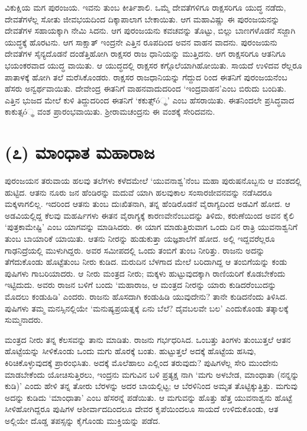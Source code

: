 ವಿಕುಕ್ಷಿಯ ಮಗ ಪುರಂಜಯ. ಇವನು ತುಂಬ ಕೀರ್ತಿಶಾಲಿ. ಒಮ್ಮೆ ದೇವತೆಗಳಿಗೂ ರಾಕ್ಷಸರಿಗೂ ಯುದ್ಧ ನಡೆದು, ದೇವತೆಗಳೆಲ್ಲ ಸೋತು ಜೀವಭಯದಿಂದ ದಿಕ್ಕಾಪಾಲಾಗ ಬೇಕಾಯಿತು. ಆಗ ಮಹಾವಿಷ್ಣು ಈ ಪುರಂಜಯನನ್ನು ದೇವತೆಗಳ ಸಹಾಯಕ್ಕಾಗಿ ನೇಮಿ ಸಿದನು. ಆಗ ಪುರಂಜಯನು ಕವಚವನ್ನು ತೊಟ್ಟು, ಬಿಲ್ಲು ಬಾಣಗಳೊಡನೆ ಸಜ್ಜಾಗಿ ಯುದ್ಧಕ್ಕೆ ಹೊರಟನು. ಆಗ ಸಾಕ್ಷಾತ್ ಇಂದ್ರನೇ ಎತ್ತಿನ ರೂಪದಿಂದ ಅವನ ವಾಹನ ವಾದನು. ಪುರಂಜಯನು ದೇವತೆಗಳ ಸೈನ್ಯದೊಡನೆ ದಂಡೆತ್ತಿಹೋಗಿ ರಾಕ್ಷಸರ ರಾಜ ಧಾನಿಯನ್ನು ಮುತ್ತಿದನು. ಆಗ ರಾಕ್ಷಸರಿಗೂ ಆತನಿಗೂ ಭಯಂಕರವಾದ ಯುದ್ಧ ವಾಯಿತು. ಆ ಯುದ್ಧದಲ್ಲಿ ರಾಕ್ಷಸರ ಕಗ್ಗೊಲೆಯಾಗಿಹೋಯಿತು. ಸಾಯದೆ ಉಳಿದವ ರೆಲ್ಲರೂ ಪಾತಾಳಕ್ಕೆ ಹೋಗಿ ತಲೆ ಮರೆಸಿಕೊಂಡರು. ರಾಕ್ಷಸರ ರಾಜಧಾನಿಯನ್ನು ಗೆದ್ದುದ ರಿಂದ ಈತನಿಗೆ ಪುರಂಜಯನೆಂಬ ಹೆಸರು ಅನ್ವರ್ಥವಾಯಿತು. ದೇವೇಂದ್ರ ಈತನಿಗೆ ವಾಹನವಾದುದರಿಂದ ‘ಇಂದ್ರವಾಹನ’ಎಂಬ ಬಿರುದು ಬಂದಿತು. ಎತ್ತಿನ ಭುಜದ ಮೇಲೆ ಕುಳಿ ತಿದ್ದುದರಿಂದ ಈತನಿಗೆ ‘ಕಕುತ್ಸ್​ó್ಥ’ ಎಂಬ ಹೆಸರಾಯಿತು. ಈತನಿಂದಲೇ ಪ್ರಸಿದ್ಧವಾದ ಕಾಕುತ್ಸó್ಥ ವಂಶ ಪ್ರಾರಂಭವಾಯಿತು. ಶ್ರೀರಾಮಚಂದ್ರನು ಈ ವಂಶಕ್ಕೆ ಸೇರಿದವನು.


\section{(೭) ಮಾಂಧಾತ ಮಹಾರಾಜ}

ಪುರಂಜಯನ ತರುವಾಯ ಹಲವು ತಲೆಗಳು ಕಳೆದಮೇಲೆ ‘ಯುವನಾಶ್ವ’ನೆಂಬ ಮಹಾ ಪುರುಷನೊಬ್ಬನು ಆ ವಂಶದಲ್ಲಿ ಹುಟ್ಟಿದ. ಆತನು ನೂರು ಜನ ಹೆಂಡಿರನ್ನು ಮದುವೆ ಯಾಗಿ ಹಲವುಕಾಲ ಸಂಸಾರಜೀವನವನ್ನು ನಡೆಸಿದರೂ ಮಕ್ಕಳಾಗಲಿಲ್ಲ. ಇದರಿಂದ ಆತನು ತುಂಬ ದುಃಖಿತನಾಗಿ, ತನ್ನ ಹೆಂಡಿರೊಡನೆ ವೈರಾಗ್ಯದಿಂದ ಅಡವಿಗೆ ಹೋದ. ಆ ಅಡವಿಯಲ್ಲಿದ್ದ ಕೆಲವು ಮಹರ್ಷಿಗಳು ಈತನ ವೈರಾಗ್ಯಕ್ಕೆ ಕಾರಣವೇನೆಂಬುದನ್ನು ತಿಳಿದು, ಕರುಣೆಯಿಂದ ಅವನ ಕೈಲಿ ‘ಪುತ್ರಕಾಮೇಷ್ಟಿ’ ಎಂಬ ಯಾಗವನ್ನು ಮಾಡಿಸಿದರು. ಈ ಯಾಗ ಮಾಡುತ್ತಿರುವಾಗ ಒಂದು ದಿನ ರಾತ್ರಿ ಯುವನಾಶ್ವನಿಗೆ ತುಂಬ ಬಾಯಾರಿಕೆ ಯಾಯಿತು. ಆತನು ನೀರನ್ನು ಹುಡುಕುತ್ತಾ ಯಜ್ಞಶಾಲೆಗೆ ಹೋದ. ಅಲ್ಲಿ ಇದ್ದವರೆಲ್ಲರೂ ಗಾಢನಿದ್ರೆಯಲ್ಲಿ ಮುಳುಗಿದ್ದರು. ಅವರ ಸಮೀಪದಲ್ಲಿ ಒಂದು ತಂಬಿಗೆ ತುಂಬ ನೀರಿತ್ತು. ರಾಜನು ಅದನ್ನು ತೆಗೆದುಕೊಂಡು ಹೊಟ್ಟೆತುಂಬ ನೀರು ಕುಡಿದ. ಮರುದಿನ ಬೆಳಗಾದ ಮೇಲೆ ಬರಿದಾಗಿದ್ದ ಆ ತಂಬಿಗೆಯನ್ನು ಕಂಡು ಪುಷಿಗಳು ಗಾಬರಿಯಾದರು. ಆ ನೀರು ಮಂತ್ರದ ನೀರು; ಮಕ್ಕಳು ಹುಟ್ಟುವುದಕ್ಕಾಗಿ ರಾಣಿಯರಿಗೆ ಕೊಡಬೇಕೆಂದು ಇಟ್ಟಿದುದು. ಅವರು ರಾಜನ ಬಳಿಗೆ ಬಂದು ‘ಮಹಾರಾಜ, ಆ ಮಂತ್ರದ ನೀರನ್ನು ಯಾರು ಕುಡಿದರೆಂಬುದನ್ನು ಮೊದಲು ಕಂಡುಹಿಡಿ’ ಎಂದರು. ರಾಜನು ಹೊಸದಾಗಿ ಕಂಡುಹಿಡಿ ಯುವುದೇನು? ತಾನೇ ಕುಡಿದನೆಂದು ತಿಳಿಸಿದ. ಪುಷಿಗಳು ತಮ್ಮ ಮನಸ್ಸಿನಲ್ಲಿಯೇ ‘ಮನುಷ್ಯಪ್ರಯತ್ನಕ್ಕೆ ಏನು ಬೆಲೆ? ದೈವಬಲವೇ ಬಲ’ ಎಂದುಕೊಂಡು ತತ್ಕಾಲಕ್ಕೆ ಸುಮ್ಮನಾದರು. 

ಮಂತ್ರದ ನೀರು ತನ್ನ ಕೆಲಸವನ್ನು ತಾನು ಮಾಡಿತು. ರಾಜನು ಗರ್ಭಧರಿಸಿದ. ಒಂಬತ್ತು ತಿಂಗಳು ತುಂಬುತ್ತಲೆ ಆತನ ಹೊಟ್ಟೆಯನ್ನು ಸೀಳಿಕೊಂಡು ಒಂದು ಮಗು ಹೊರಕ್ಕೆ ಬಂತು. ಹುಟ್ಟುತ್ತಲೆ ಅದಕ್ಕೆ ಹೊಟ್ಟೆಯ ಹಸಿವು, ಕಿರಿಚಿಕೊಳ್ಳುವುದಕ್ಕೆ ಪ್ರಾರಂಭಿಸಿತು. ಅದಕ್ಕೆ ಮೊಲೆಹಾಲು ಎಲ್ಲಿಂದ ತರುವುದು? ಪುಷಿಗಳೆಲ್ಲ ಸೇರಿ ಮುಂದೇನು ಮಾಡಬೇಕೆಂದು ಯೋಚಿಸುತ್ತಿರಲು, ಇಂದ್ರನು ಮಗುವಿನ ಬಳಿ ಪ್ರತ್ಯಕ್ಷ ನಾಗಿ ‘ಮಗು ಅಳಬೇಡ, ಮಾಂಧಾತಾ (ನನ್ನನ್ನು ಕುಡಿ)’ ಎಂದು ಹೇಳಿ ತನ್ನ ತೋರು ಬೆರಳನ್ನು ಅದರ ಬಾಯಲ್ಲಿಟ್ಟ; ಆ ಬೆರಳಿನಿಂದ ಅಮೃತ ತೊಟ್ಟಿಕ್ಕುತ್ತಿತ್ತು. ಮಗುವು ಅದನ್ನು ಕುಡಿದು ‘ಮಾಂಧಾತಾ’ ಎಂಬ ಹೆಸರನ್ನೆ ಪಡೆಯಿತು. ಆ ಮಗುವನ್ನು ಹೊತ್ತು ಹೆತ್ತ ಯುವನಾಶ್ವನು ಹೊಟ್ಟೆ ಸೀಳಿಹೋಗಿದ್ದರೂ ಪುಷಿಗಳ ಆಶೀರ್ವಾದದಿಂದಲೂ ದೇವರ ಕೃಪೆಯಿಂದಲೂ ಸಾಯದೆ ಉಳಿದುಕೊಂಡು, ಆತ ಅಲ್ಲಿಯೇ ದೊಡ್ಡ ತಪಸ್ಸನ್ನು ಕೈಗೊಂಡು ಮುಕ್ತಿಯನ್ನು ಪಡೆದ. 

